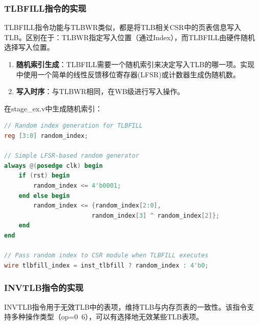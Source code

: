 \subsubsection{TLBFILL指令的实现}

TLBFILL指令功能与TLBWR类似，都是将TLB相关CSR中的页表信息写入TLB。区别在于：TLBWR指定写入位置（通过Index），而TLBFILL由硬件随机选择写入位置。

\begin{enumerate}
    \item \textbf{随机索引生成}：TLBFILL需要一个随机索引来决定写入TLB的哪一项。实现中使用一个简单的线性反馈移位寄存器(LFSR)或计数器生成伪随机数。
    
    \item \textbf{写入时序}：与TLBWR相同，在WB级进行写入操作。
    
\end{enumerate}

在stage\_ex.v中生成随机索引：

\begin{lstlisting}[language=Verilog, caption=TLBFILL随机索引生成]
// Random index generation for TLBFILL
reg [3:0] random_index;

// Simple LFSR-based random generator
always @(posedge clk) begin
    if (rst) begin
        random_index <= 4'b0001;
    end else begin
        random_index <= {random_index[2:0], 
                        random_index[3] ^ random_index[2]};
    end
end

// Pass random index to CSR module when TLBFILL executes
wire tlbfill_index = inst_tlbfill ? random_index : 4'b0;
\end{lstlisting}

\subsubsection{INVTLB指令的实现}

INVTLB指令用于无效TLB中的表项，维持TLB与内存页表的一致性。该指令支持多种操作类型（op=0~6），可以有选择地无效某些TLB表项。

